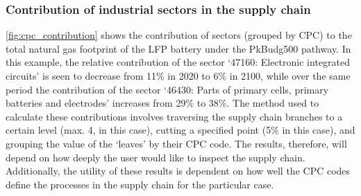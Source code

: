 
\subsubsection{Contribution of industrial sectors in the supply chain}\label{sec:results-case_study-topsectors}

\autoref{fig:cpc_contribution} shows the contribution of sectors (grouped by CPC) to the total natural gas footprint of the LFP battery under the PkBudg500 pathway. In this example, the relative contribution of the sector `47160: Electronic integrated circuits' is seen to decrease from 11\% in 2020 to 6\% in 2100, while over the same period the contribution of the sector `46430: Parts of primary cells, primary batteries and electrodes' increases from 29\% to 38\%. The method used to calculate these contributions involves traversing the supply chain branches to a certain level (max. 4, in this case), cutting a specified point (5\% in this case), and grouping the value of the `leaves' by their CPC code. The results, therefore, will depend on how deeply the user would like to inspect the supply chain. Additionally, the utility of these results is dependent on how well the CPC codes define the processes in the supply chain for the particular case. 

